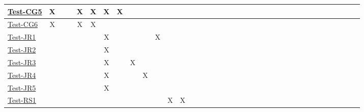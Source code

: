 \documentclass[12pt, titlepage]{article}
\begin{document}
\begin{landscape}
\begin{table}[H]
\begin{adjustwidth}{-0.1in}{-1in}
{\begin{tabular}{|c|c|c|c|c|c|c|c|c|c|c|c|c|c|c|c|c|l|l|l|l|l|l|l|l|l|l|l|l|l|l|l|l|l|l|l|l|}
\multicolumn{1}{|l|}{\hyperref[itm:Test-CG5]{Test-CG5}}   &             X&              &             &             X&     X        &        X      &       X       &             &              &              &             &             &              &              &              &                & & & & & & & & &\\ \hline
\multicolumn{1}{|l|}{\hyperref[itm:Test-CG6]{Test-CG6}}   &              X&              &              &             X&     X         &             &             &             &              &              &              &             &              &              &              &                & & & & & & & & &\\ \hline
\multicolumn{1}{|l|}{\hyperref[itm:Test-JR1]{Test-JR1}}   &             &             &             &              &             &              X&              &             &              &              X&              &              &              &              &              &                & & & & & & & & &\\ \hline
\multicolumn{1}{|l|}{\hyperref[itm:Test-JR2]{Test-JR2}}   &             &              &             &             &             &              X&              &             &              &              &             &             &              &              &              &                & & & & & & & & &\\ \hline
\multicolumn{1}{|l|}{\hyperref[itm:Test-JR3]{Test-JR3}}   &             &             &             &              &             &              X&              &             X&              &              &              &             &              &              &              &                & & & & & & & & &\\ \hline
\multicolumn{1}{|l|}{\hyperref[itm:Test-JR4]{Test-JR4}}   &             &             &             &              &             &              X&              &             &              X&              &             &             &              &              &              &                & & & & & & & & &\\ \hline
\multicolumn{1}{|l|}{\hyperref[itm:Test-JR5]{Test-JR5}}   &             &              &             &             &             &              X&              &             &              &              &             &             &              &              &              &                & & & & & & & & &\\ \hline
\multicolumn{1}{|l|}{\hyperref[itm:Test-RS1]{Test-RS1}}   &             &             &             &              &             &              &              &             &              &              &              X&              X&              &              &              &                & & & & & & & & &\\ \hline

\end{tabular}}
\end{adjustwidth}
\end{table}
\end{landscape}
\end{document}
